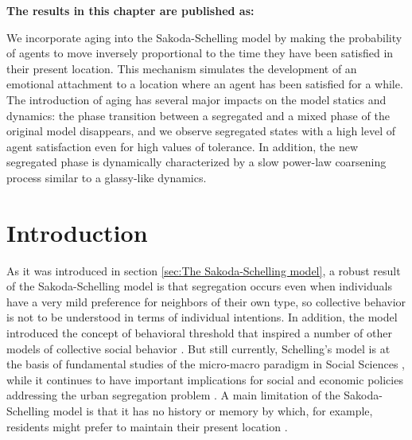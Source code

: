 \vspace{-1.5cm}
\small
\textbf{The results in this chapter are published as:}
\vspace{0.05 cm}

\normalsize
\vspace{0.5 cm}

We incorporate aging into the Sakoda-Schelling model by making the probability of agents to move inversely proportional to the time they have been satisfied in their present location. This mechanism simulates the development of an emotional attachment to a location where an agent has been satisfied for a while. The introduction of aging has several major impacts on the model statics and dynamics: the phase transition between a segregated and a mixed phase of the original model disappears, and we observe segregated states with a high level of agent satisfaction even for high values of tolerance. In addition, the new segregated phase is dynamically characterized by a slow power-law coarsening process similar to a glassy-like dynamics.

\section{Introduction}

As it was introduced in section \ref{sec:The Sakoda-Schelling model}, a robust result of the Sakoda-Schelling model is that segregation occurs even when individuals have a very mild preference for neighbors of their own type, so collective behavior is not to be understood in terms of individual intentions. In addition, the model introduced the concept of behavioral threshold that inspired a number of other models of collective social behavior \cite{granovetter}. But still currently, Schelling's model is at the basis of fundamental studies of the micro-macro paradigm  in Social Sciences \cite{grauwin-2009}, while it continues to have important implications for social and economic policies addressing the urban segregation problem \cite{clark-1991,Sassen,Clark,lamanna-2018}. A main limitation of the Sakoda-Schelling model is that it has no history or memory by which, for example, residents might prefer to maintain their present location \cite{silver-2021}.

